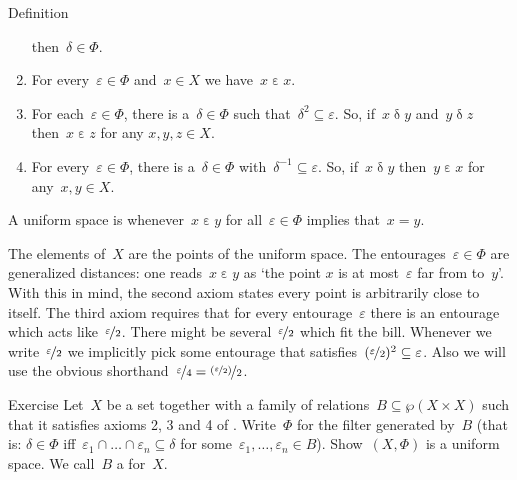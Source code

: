 \begin{parsec}
\begin{point}{Definition}
\begin{enumerate}
\begin{inparaenum}
            then~$\delta \in \Phi$.
        \end{inparaenum}
    \item
        For every~$\varepsilon \in \Phi$
            and~$x \in X$ we have~$x \mathrel\varepsilon x$.
    \item
        For each~$\varepsilon \in \Phi$,
            there is a~$\delta \in \Phi$
            such that~$\delta^2 \subseteq \varepsilon$.
        So, if~$x \mathrel\delta y$ and~$y \mathrel\delta z$
            then~$x \mathrel\varepsilon z$ for any $x,y,z \in X$.
    \item
        For every~$\varepsilon \in \Phi$,
            there is a~$\delta \in \Phi$
                with~$\delta^{-1}\subseteq \varepsilon$.
        So, if~$x \mathrel\delta y$ then~$y \mathrel\varepsilon x$
            for any~$x,y \in X$.
    \end{enumerate}
    A uniform space is 
        whenever~$x \mathrel\varepsilon y$
            for all~$\varepsilon \in \Phi$
            implies that~$x=y$.
\begin{point}%
The elements of~$X$ are the points of the uniform space.
The entourages~$\varepsilon \in \Phi$
    are generalized distances:
one reads~$x \mathrel\varepsilon y$ as
    `the point $x$ is at most~$\varepsilon$ far from to~$y$'.
With this in mind, the second axiom states every point is arbitrarily close
    to itself.
The third axiom requires that for every entourage~$\varepsilon$
    there is an entourage which acts like~$\nicefrac{\varepsilon}{2}$.
There might be several~$\nicefrac{\varepsilon}{2}$
    which fit the bill.
Whenever we write~$\nicefrac{\varepsilon}{2}$
    we implicitly pick some entourage that
    satisfies~$(\nicefrac{\varepsilon}{2})^2 \subseteq \varepsilon$.
Also we will use the obvious shorthand~$\nicefrac{\varepsilon}{4}
=   \nicefrac{(\nicefrac{\varepsilon}{2})}{2}$.
\end{point}
\end{point}
\begin{point}{Exercise}%
Let~$X$ be a set together with
    a family of relations~$B \subseteq \wp (X \times X)$
    such that it satisfies axioms 2, 3 and 4
    of .
Write~$\Phi$ for the filter generated by~$B$
    (that is: $\delta \in \Phi$
        iff~$\varepsilon_1 \cap \ldots \cap \varepsilon_n \subseteq \delta$
            for some~$\varepsilon_1, \ldots, \varepsilon_n \in B$).
Show~$(X,\Phi)$ is a uniform space.
We call~$B$ a  for~$X$.

\end{point}
\end{parsec}
